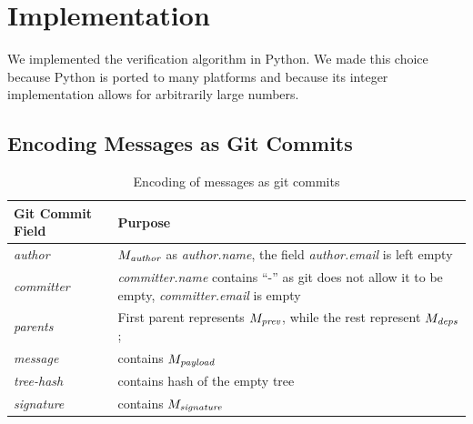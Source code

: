 

\chapter{Implementation}
We implemented the verification algorithm in Python. We made this choice because Python is ported to many platforms and because its integer implementation allows for arbitrarily large numbers.

\section{Encoding Messages as Git Commits}
\label{sec:payload-syntax}
\begin{table}
\begin{tabular}{|l|p{7cm}|}
\hline
\textbf{Git Commit Field} & \textbf{Purpose} \\
\hline
\emph{author} & $M_\emph{author}$ as \emph{author.name}, the field \emph{author.email} is left empty \\
\emph{committer} & \emph{committer.name} contains ``-'' as git does not allow it to be empty, \emph{committer.email} is empty \\
\emph{parents} & First parent represents $M_\emph{prev}$, while the rest represent $M_\emph{deps}$; \\
\emph{message} & contains $M_\emph{payload}$\\
\emph{tree-hash} & contains hash of the empty tree \\
\emph{signature} & contains $M_\emph{signature}$ \\
\hline
\end{tabular}
\caption{Encoding of messages as git commits}
\label{tab:msg-encoded-as-commit}
\end{table}

